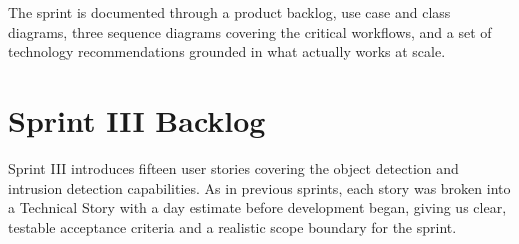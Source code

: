 \hspace{0.8cm}The sprint is documented through a product backlog, use case and class diagrams, three sequence diagrams covering the critical workflows, and a set of technology recommendations grounded in what actually works at scale.

\section{Sprint III Backlog}
\label{sec:s3_backlog}

\hspace{0.8cm}Sprint III introduces fifteen user stories covering the object detection and intrusion detection capabilities. As in previous sprints, each story was broken into a Technical Story with a day estimate before development began, giving us clear, testable acceptance criteria and a realistic scope boundary for the sprint.

